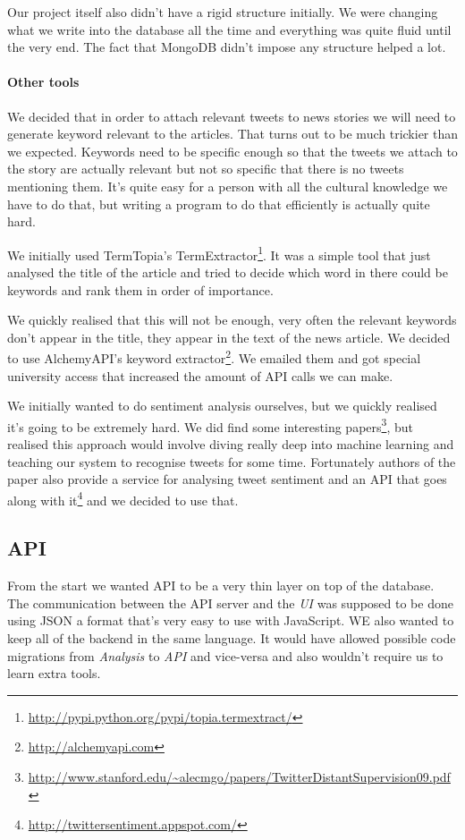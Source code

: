 \documentclass{report}
\begin{document}
		Our project itself also didn't have a rigid structure initially. We were changing what we write into the database all the time and everything was quite fluid until the very end. The fact that MongoDB didn't impose any structure helped a lot.
		
		\paragraph{Other tools} We decided that in order to attach relevant tweets to news stories we will need to generate keyword relevant to the articles. That turns out to be much trickier than we expected. Keywords need to be specific enough so that the tweets we attach to the story are actually relevant but not so specific that there is no tweets mentioning them. It's quite easy for a person with all the cultural knowledge we have to do that, but writing a program to do that efficiently is actually quite hard.
		
		We initially used TermTopia's TermExtractor\footnote{\url{http://pypi.python.org/pypi/topia.termextract/}}. It was a simple tool that just analysed the title of the article and tried to decide which word in there could be keywords and rank them in order of importance.
		
		We quickly realised that this will not be enough, very often the relevant keywords don't appear in the title, they appear in the text of the news article. We decided to use AlchemyAPI's keyword extractor\footnote{\url{http://alchemyapi.com}}. We emailed them and got special university access that increased the amount of API calls we can make.
		
		We initially wanted to do sentiment analysis ourselves, but we quickly realised it's going to be extremely hard. We did find some interesting papers\footnote{\url{http://www.stanford.edu/~alecmgo/papers/TwitterDistantSupervision09.pdf}}, but realised this approach would involve diving really deep into machine learning and teaching our system to recognise tweets for some time. Fortunately authors of the paper also provide a service for analysing tweet sentiment and an API that goes along with it\footnote{\url{http://twittersentiment.appspot.com/}} and we decided to use that.
		
		\subsection{API}
		From the start we wanted API to be a very thin layer on top of the database. The communication between the API server and the \emph{UI} was supposed to be done using JSON a format that's very easy to use with JavaScript. WE also wanted to keep all of the backend in the same language. It would have allowed possible code migrations from \emph{Analysis} to \emph{API} and vice-versa and also wouldn't require us to learn extra tools.
		
\end{document}
